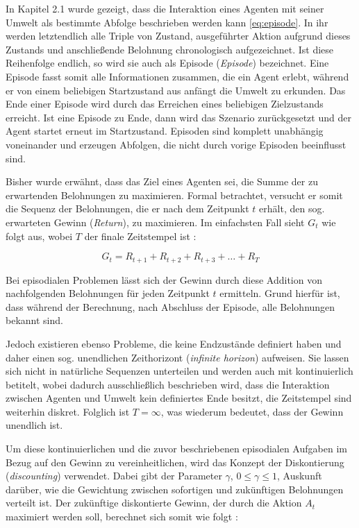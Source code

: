 In Kapitel 2.1 wurde gezeigt, dass die Interaktion eines Agenten mit seiner Umwelt als bestimmte Abfolge beschrieben werden kann \eqref{eq:episode}. In ihr werden letztendlich alle Triple von Zustand, ausgeführter Aktion aufgrund dieses Zustands und anschließende Belohnung chronologisch aufgezeichnet. Ist diese Reihenfolge endlich, so wird sie auch als Episode (\textit{Episode}) bezeichnet. Eine Episode fasst somit alle Informationen zusammen, die ein Agent erlebt, während er von einem beliebigen Startzustand aus anfängt die Umwelt zu erkunden. Das Ende einer Episode wird durch das Erreichen eines beliebigen Zielzustands erreicht. Ist eine Episode zu Ende, dann wird das Szenario zurückgesetzt und der Agent startet erneut im Startzustand. Episoden sind komplett unabhängig voneinander und erzeugen Abfolgen, die nicht durch vorige Episoden beeinflusst sind.
\par
Bisher wurde erwähnt, dass das Ziel eines Agenten sei, die Summe der zu erwartenden Belohnungen zu maximieren. Formal betrachtet, versucht er somit die Sequenz der Belohnungen, die er nach dem Zeitpunkt $t$ erhält, den sog. erwarteten Gewinn (\textit{Return}), zu maximieren. Im einfachsten Fall sieht $G_t$ wie folgt aus, wobei $T$ der finale Zeitstempel ist \cite[S.55]{Sutton1998}:

\begin{equation}\label{eq:simpleReturn}
    G_t = R_{t+1} + R_{t+2} + R_{t+3} + \dots + R_{T}
\end{equation}

Bei episodialen Problemen lässt sich der Gewinn durch diese Addition von nachfolgenden Belohnungen für jeden Zeitpunkt $t$ ermitteln. Grund hierfür ist, dass während der Berechnung, nach Abschluss der Episode, alle Belohnungen bekannt sind. 
\par 
Jedoch existieren ebenso Probleme, die keine Endzustände definiert haben und daher einen sog. unendlichen Zeithorizont (\textit{infinite horizon}) aufweisen. Sie lassen sich nicht in natürliche Sequenzen unterteilen und werden auch mit \glqq kontinuierlich\grqq{} betitelt, wobei dadurch ausschließlich beschrieben wird, dass die Interaktion zwischen Agenten und Umwelt kein definiertes Ende besitzt, die Zeitstempel sind weiterhin diskret. Folglich ist $T=\infty$, was wiederum bedeutet, dass der Gewinn unendlich ist.
\par 
Um diese kontinuierlichen und die zuvor beschriebenen episodialen Aufgaben im Bezug auf den Gewinn zu vereinheitlichen, wird das Konzept der Diskontierung (\textit{discounting}) verwendet. Dabei gibt der Parameter $\gamma$, $0\leq \gamma \leq 1$, Auskunft darüber, wie die Gewichtung zwischen sofortigen und zukünftigen Belohnungen verteilt ist. Der zukünftige diskontierte Gewinn, der durch die Aktion $A_t$ maximiert werden soll, berechnet sich somit wie folgt \cite[S.55]{Sutton1998}:

